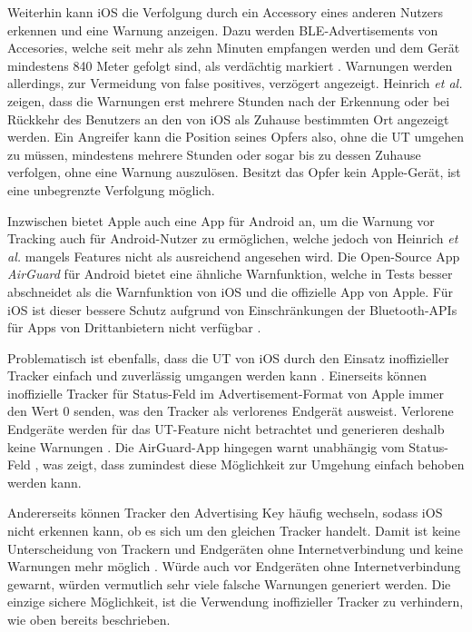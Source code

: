 Weiterhin kann iOS die Verfolgung durch ein Accessory eines anderen Nutzers erkennen und eine Warnung anzeigen.
Dazu werden \ac{BLE}-Advertisements von Accesories, welche seit mehr als zehn Minuten empfangen werden und dem Gerät mindestens 840 Meter gefolgt sind, als verdächtig markiert \cite{Heinrich_AirGuard}.
Warnungen werden allerdings, zur Vermeidung von false positives, verzögert angezeigt.
Heinrich \textit{et al.} \cite{Heinrich_AirGuard} zeigen, dass die Warnungen erst mehrere Stunden nach der Erkennung oder bei Rückkehr des Benutzers an den von iOS als Zuhause bestimmten Ort angezeigt werden.
Ein Angreifer kann die Position seines Opfers also, ohne die \ac{UT} umgehen zu müssen, mindestens mehrere Stunden oder sogar bis zu dessen Zuhause verfolgen, ohne eine Warnung auszulösen.
Besitzt das Opfer kein Apple-Gerät, ist eine unbegrenzte Verfolgung möglich.

Inzwischen bietet Apple auch eine App für Android an, um die Warnung vor Tracking auch für Android-Nutzer zu ermöglichen, welche jedoch von Heinrich \textit{et al.} \cite{Heinrich_AirGuard} mangels Features nicht als ausreichend angesehen wird.
Die Open-Source App \textit{AirGuard} für Android bietet eine ähnliche Warnfunktion, welche in Tests besser abschneidet als die Warnfunktion von iOS und die offizielle App von Apple.
Für iOS ist dieser bessere Schutz aufgrund von Einschränkungen der Bluetooth-\acp{API} für Apps von Drittanbietern nicht verfügbar \cite{Heinrich_AirGuard}.

Problematisch ist ebenfalls, dass die \ac{UT} von iOS durch den Einsatz inoffizieller Tracker einfach und zuverlässig umgangen werden kann \cite{Heinrich_AirGuard,Mayberry_Tracking}.
Einerseits können inoffizielle Tracker für Status-Feld im Advertisement-Format von Apple immer den Wert 0 senden, was den Tracker als verlorenes Endgerät ausweist.
Verlorene Endgeräte werden für das \ac{UT}-Feature nicht betrachtet und generieren deshalb keine Warnungen \cite{Heinrich_AirGuard,Mayberry_Tracking}.
Die AirGuard-App hingegen warnt unabhängig vom Status-Feld \cite{Heinrich_AirGuard}, was zeigt, dass zumindest diese Möglichkeit zur Umgehung einfach behoben werden kann.

Andererseits können Tracker den Advertising Key häufig wechseln, sodass iOS nicht erkennen kann, ob es sich um den gleichen Tracker handelt.
Damit ist keine Unterscheidung von Trackern und Endgeräten ohne Internetverbindung und keine Warnungen mehr möglich \cite{Mayberry_Tracking}.
Würde auch vor Endgeräten ohne Internetverbindung gewarnt, würden vermutlich sehr viele falsche Warnungen generiert werden.
Die einzige sichere Möglichkeit, ist die Verwendung inoffizieller Tracker zu verhindern, wie oben bereits beschrieben.


